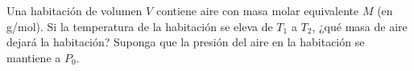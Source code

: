 \item Una habitación de volumen $V$ contiene aire con masa molar equivalente $M$ (en g/mol). Si la temperatura de la habitación se eleva de $T_1$ a $T_2$, ¿qué masa de aire dejará la habitación? Suponga que la presión del aire en la habitación se mantiene a $P_0$.
